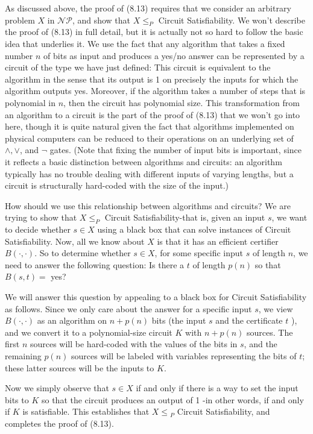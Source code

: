 \documentclass[a4paper, 12pt]{book}
\theoremstyle{dotless}
\begin{document}
As discussed above, the proof of (8.13) requires that we consider an arbitrary problem $X$ in $\mathcal{N} \mathcal{P}$, and show that $X \leq_{P}$ Circuit Satisfiability. We won't describe the proof of (8.13) in full detail, but it is actually not so hard to follow the basic idea that underlies it. We use the fact that any algorithm that takes a fixed number $n$ of bits as input and produces a yes/no answer can be represented by a circuit of the type we have just defined: This circuit is equivalent to the algorithm in the sense that its output is 1 on precisely the inputs for which the algorithm outputs yes. Moreover, if the algorithm takes a number of steps that is polynomial in $n$, then the circuit has polynomial size. This transformation from an algorithm to a circuit is the part of the proof of (8.13) that we won't go into here, though it is quite natural given the fact that algorithms implemented on physical computers can be reduced to their operations on an underlying set of $\wedge, \vee$, and $\neg$ gates. (Note that fixing the number of input bits is important, since it reflects a basic distinction between algorithms and circuits: an algorithm typically has no trouble dealing with different inputs of varying lengths, but a circuit is structurally hard-coded with the size of the input.)

How should we use this relationship between algorithms and circuits? We are trying to show that $X \leq_{P}$ Circuit Satisfiability-that is, given an input $s$, we want to decide whether $s \in X$ using a black box that can solve instances of Circuit Satisfiability. Now, all we know about $X$ is that it has an efficient certifier $B(\cdot, \cdot)$. So to determine whether $s \in X$, for some specific input $s$ of length $n$, we need to answer the following question: Is there a $t$ of length $p(n)$ so that $B(s, t)=$ yes?

We will answer this question by appealing to a black box for Circuit Satisfiability as follows. Since we only care about the answer for a specific input $s$, we view $B(\cdot, \cdot)$ as an algorithm on $n+p(n)$ bits (the input $s$ and the certificate $t$ ), and we convert it to a polynomial-size circuit $K$ with $n+p(n)$ sources. The first $n$ sources will be hard-coded with the values of the bits in $s$, and the remaining $p(n)$ sources will be labeled with variables representing the bits of $t$; these latter sources will be the inputs to $K$.

Now we simply observe that $s \in X$ if and only if there is a way to set the input bits to $K$ so that the circuit produces an output of 1 -in other words, if and only if $K$ is satisfiable. This establishes that $X \leq{ }_{P}$ Circuit Satisfiability, and completes the proof of (8.13).
\end{document}
